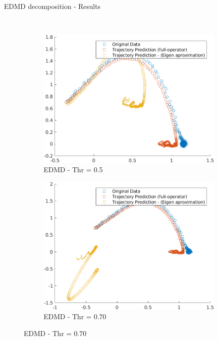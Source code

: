 \documentclass{beamer}
\begin{document}
\begin{frame}{EDMD decomposition - Results}
\begin{figure}
\begin{subfigure}[b]{0.3\textwidth}
            \label{fig:EDMD_00}
        \end{subfigure}
        \\
        \begin{subfigure}[b]{0.3\textwidth}
            \centering
            \includegraphics[width=\textwidth]{EDMD_50.png}
            \caption{EDMD - Thr = 0.5}
            \label{fig:EDMD_50}
        \end{subfigure}
        \begin{subfigure}[b]{0.3\textwidth}
            \centering
            \includegraphics[width=\textwidth]{EDMD_70.png}
            \caption{EDMD - Thr = 0.70}
            \label{fig:EDMD_70}
        \end{subfigure}
        \label{fig:EDMD}
   \end{figure}
\end{frame}
\end{document}
